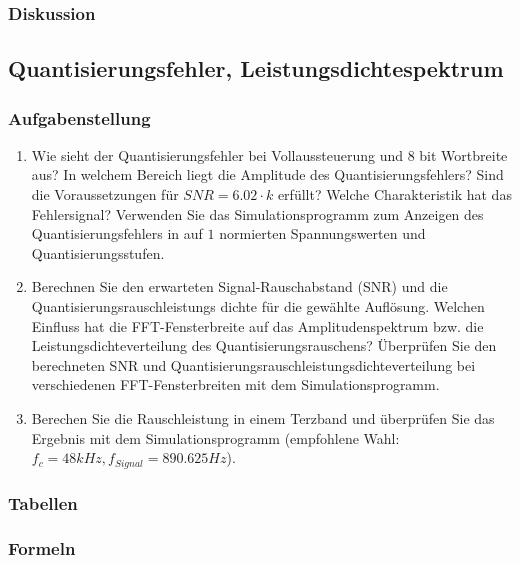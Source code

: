 \clearpage

\subsubsection{Diskussion}
\pagebreak

%
%

\subsection{Quantisierungsfehler, Leistungsdichtespektrum}
\subsubsection{Aufgabenstellung}
\begin{enumerate}
\item Wie sieht der Quantisierungsfehler bei Vollaussteuerung und $8$ bit Wortbreite aus? In welchem Bereich liegt die Amplitude des Quantisierungsfehlers? Sind die Voraussetzungen für $SNR = 6.02 \cdot k$ erfüllt? Welche Charakteristik hat das Fehlersignal? Verwenden Sie das Simulationsprogramm zum Anzeigen des Quantisierungsfehlers in auf $1$ normierten Spannungswerten und Quantisierungsstufen. 
\item Berechnen Sie den erwarteten Signal-Rauschabstand (SNR) und die Quantisierungsrauschleistungs dichte für die gewählte Auflösung. Welchen Einfluss hat die FFT-Fensterbreite auf das Amplitudenspektrum bzw. die Leistungsdichteverteilung des Quantisierungsrauschens?
Überprüfen Sie den berechneten SNR und Quantisierungsrauschleistungsdichteverteilung bei verschiedenen FFT-Fensterbreiten mit dem Simulationsprogramm. 
\item Berechen Sie die Rauschleistung in einem Terzband und überprüfen Sie das Ergebnis mit dem Simulationsprogramm (empfohlene Wahl: $f_c = 48kHz, f_{Signal} = 890.625Hz$). 
\end{enumerate}



\subsubsection{Tabellen}

\subsubsection{Formeln}

